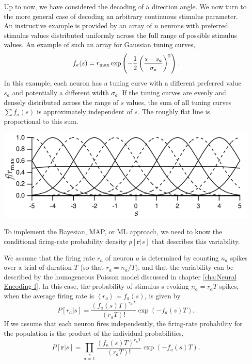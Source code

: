 \begin{exm}
  \label{exm:Gaussian tuning curves}
  Up to now, we have considered the decoding of a direction angle. We now
turn to the more general case of decoding an arbitrary continuous stimulus
parameter. An instructive example is provided by an array of $n$ neurons
with preferred stimulus values distributed uniformly across the full range
of possible stimulus values. An example of such an array for Gaussian
tuning curves,
\begin{equation}
  \label{eq:3.28}
  f_a(s)=r_{\rm{max}}\exp\left(-\frac{1}{2}\left(
      \frac{s-s_{a}}{\sigma_{a}} \right)^{2}\right).
\end{equation}
In this example, each neuron has a tuning curve
with a different preferred value $s_{a}$ and potentially a different
width $\sigma_{a}$. If the tuning curves are evenly and densely distributed across the range of $s$ values, the
sum of all tuning curves
$\sum f_a(s)$ is approximately independent of $s$. The roughly flat line is proportional to this sum.
\begin{center}
  \label{fig:3-8}
  \includegraphics[scale = 0.4]{./png/3-8}
\end{center}
\end{exm}

\begin{rem}
  To implement the Bayesian, MAP, or ML approach, we need to
know the conditional firing-rate probability density $p[\mathbf{r}|s]$ that describes
this variability.
\end{rem}

\begin{prop}
  \label{prop:conditional firing-rate probability density}
  We assume that the firing rate $r_{a}$ of neuron $a$ is determined
by counting $n_{a}$ spikes over a trial of duration $T$ (so that $r_{a} = n_{a}/T$), and
that the variability can be described by the homogeneous Poisson model
discussed in chapter \ref{cha:Neural Encoding I}. In this case, the probability of stimulus s evoking
$n_{a}=r_{a}T$ spikes, when the average firing rate is $\left\langle
  r_{a} \right\rangle=f_a(s)$, is given by
\begin{equation}
  \label{eq:3.29}
  P[r_a|s]=\frac{(f_a(s)T)^{r_aT}}{(r_aT)!}\exp(-f_{a}(s)T).
\end{equation}
If we assume that each neuron fires independently, the firing-rate
probability for the population is the product of the individual
probabilities,
\begin{equation}
  \label{eq:3.30}
   P[\mathbf{r}|s]=\prod\limits_{a=1}\limits^{N}{\frac{(f_a(s)T)^{r_{a}T}} {(r_aT)!}\exp(-f_{a}(s)T)}.
\end{equation}
\end{prop}

